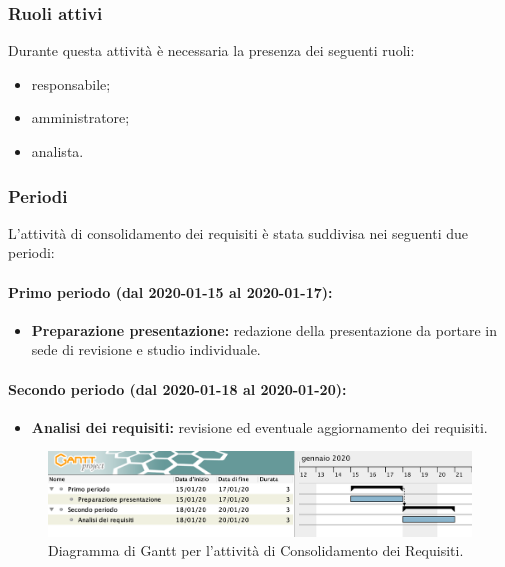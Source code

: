 			\subsubsection{Ruoli attivi}
			
				Durante questa attività è necessaria la presenza dei seguenti ruoli:
				\begin{itemize}
					\item responsabile;
					\item amministratore;
					\item analista.
				\end{itemize}
			
			\subsubsection{Periodi}
			
				L'attività di consolidamento dei requisiti è stata suddivisa nei seguenti due periodi:
				
				\paragraph{Primo periodo (dal 2020-01-15 al 2020-01-17):}
				
					\begin{itemize}
						\item \textbf{Preparazione presentazione:} redazione della presentazione da portare in sede di revisione e studio individuale.
					\end{itemize}
				
				\paragraph{Secondo periodo (dal 2020-01-18 al 2020-01-20):}
				
					\begin{itemize}
						\item \textbf{Analisi dei requisiti:} revisione ed eventuale aggiornamento dei requisiti.
					\end{itemize}

		\begin{landscape}

          \begin{figure}[H]
            \centering
            \includegraphics[width=\linewidth]{images/ganttConsolidamento}
            \caption{Diagramma di Gantt per l'attività di Consolidamento dei Requisiti.}
          \end{figure}		

		\end{landscape}

